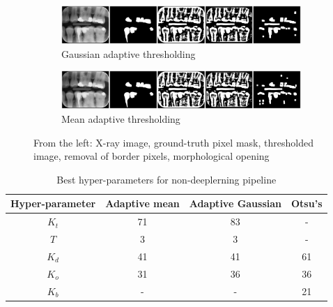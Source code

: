 \begin{figure}[h]
    \centering
    \begin{subfigure}[b]{\textwidth}
        \includegraphics[width=1\linewidth]{images/segmentation_nondl_gauss_12.pdf}
        \caption{Gaussian adaptive thresholding}
    \end{subfigure}

    \begin{subfigure}[b]{\textwidth}
        \includegraphics[width=1\linewidth]{images/segmentation_nondl_mean_12.pdf}
        \caption{Mean adaptive thresholding}
    \end{subfigure}
    \caption{From the left: X-ray image, ground-truth pixel mask, thresholded image, removal of border pixels, morphological opening}
    \label{fig:segmentation_sample_nondl}
\end{figure}

\begin{table}[H]
    \begin{tabular}{|c|c|c|c|}
        \hline
        Hyper-parameter & Adaptive mean & Adaptive Gaussian & Otsu's \\ \hline
        $K_t$           & 71            & 83                & -      \\ \hline
        $T$             & 3             & 3                 & -      \\ \hline
        $K_d$           & 41            & 41                & 61     \\ \hline
        $K_o$           & 31            & 36                & 36     \\ \hline
        $K_b$           & -             & -                 & 21     \\ \hline
    \end{tabular}
    \caption{Best hyper-parameters for non-deeplerning pipeline}
    \label{tab:nondl_restorations:best_params}
\end{table}


